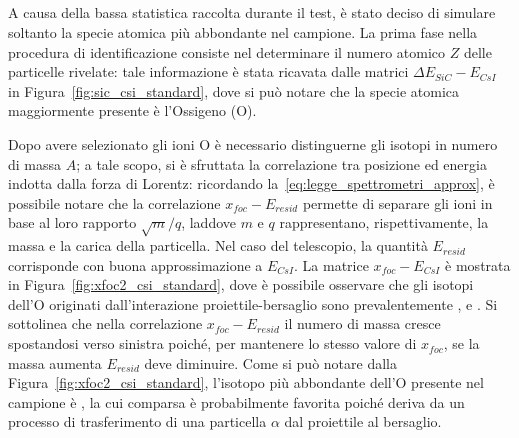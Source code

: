 
\subsection{}

A causa della bassa statistica raccolta durante il test, è stato deciso di simulare soltanto la specie atomica più abbondante nel campione.
La prima fase nella procedura di identificazione consiste nel determinare il numero atomico $Z$ delle particelle rivelate: tale informazione è stata ricavata dalle matrici $\Delta E_{SiC} - E_{CsI}$ in Figura~\ref{fig:sic_csi_standard}, dove si può notare che la specie atomica maggiormente presente è l'Ossigeno (O). 

Dopo avere selezionato gli ioni O è necessario distinguerne gli isotopi in numero di massa $A$; a tale scopo, si è sfruttata la correlazione tra posizione ed energia indotta dalla forza di Lorentz: ricordando la~\ref{eq:legge_spettrometri_approx}, è possibile notare che la correlazione $x_{foc} - E_{resid}$ permette di separare gli ioni in base al loro rapporto $\sqrt{m}/q$, laddove $m$ e $q$ rappresentano, rispettivamente, la massa e la carica della particella.
Nel caso del telescopio, la quantità $E_{resid}$ corrisponde con buona approssimazione a $E_{CsI}$.
La matrice $x_{foc} - E_{CsI}$ è mostrata in Figura~\ref{fig:xfoc2_csi_standard}, dove è possibile osservare che gli isotopi dell'O originati dall'interazione proiettile-bersaglio sono prevalentemente ,  e .
Si sottolinea che nella correlazione $x_{foc} - E_{resid}$ il numero di massa cresce spostandosi verso sinistra poiché, per mantenere lo stesso valore di $x_{foc}$, se la massa aumenta $E_{resid}$ deve diminuire.
Come si può notare dalla Figura~\ref{fig:xfoc2_csi_standard}, l'isotopo più abbondante dell'O presente nel campione è , la cui comparsa è probabilmente favorita poiché deriva da un processo di trasferimento di una particella $\alpha$ dal proiettile al bersaglio. 

